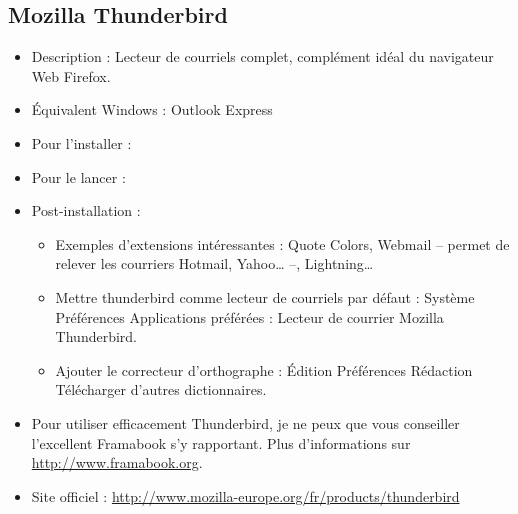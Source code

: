 \subsection{Mozilla Thunderbird}
\begin{itemize}
\begingroup
{}
\item Description : Lecteur de courriels complet, complément idéal du navigateur Web Firefox.{\par}
\item Équivalent Windows : Outlook Express{\par}
\item Pour l'installer : 
\item Pour le lancer : 
\item Post-installation :{\par}
\endgroup
\begin{itemize}
\item Exemples d'extensions intéressantes : Quote Colors, Webmail -- permet de relever les courriers Hotmail, Yahoo\ldots{} --, Lightning\ldots{}{\par}
\item Mettre thunderbird comme lecteur de courriels par défaut : Système \FlecheDroite Préférences \FlecheDroite Applications préférées : Lecteur de courrier \FlecheDroite Mozilla Thunderbird.{\par}
\item Ajouter le correcteur d'orthographe : Édition \FlecheDroite Préférences \FlecheDroite Rédaction \FlecheDroite  Télécharger d'autres dictionnaires.{\par}
\end{itemize}
\item Pour utiliser efficacement Thunderbird, je ne peux que vous conseiller l'excellent Framabook s'y rapportant. Plus d'informations sur \url{http://www.framabook.org}.
\item Site officiel : \url{http://www.mozilla-europe.org/fr/products/thunderbird}{\par}
\end{itemize}
